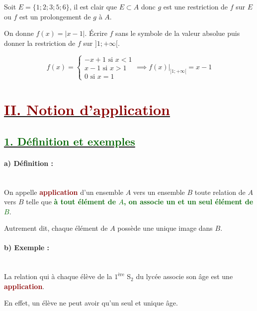 \documentclass[12pt,a4paper]{article}
\newcounter{exemple} %
\begin{document}
Soit $E = \{1 ; 2 ; 3 ; 5 ; 6\}$, il est clair que {\color{darkred}$E \subset A$} donc {\color{darkred}$g$ est une restriction} de $f$ sur $E$ ou {\color{darkred}$f$ est un prolongement} de $g$ à $A$.

On donne $f(x) = |x - 1|$. Écrire $f$ sans le symbole de la valeur absolue puis donner la restriction de $f$ sur $]1 ; +\infty[$.

$$
f(x) = \begin{cases} 
-x + 1 \text{ si } x < 1 \\ 
x - 1 \text{ si } x > 1 \\ 
0 \text{ si } x = 1 
\end{cases} 
\implies \boxed{\left. f(x) \right|_{]1 ; +\infty[} = x - 1}
$$

\section*{\underline{\textbf{\textcolor{darkred}{II. Notion d'application}}}}
\subsection*{\underline{\textbf{\textcolor{darkgreen}{1. Définition et exemples}}}}

\paragraph{\color{darkred}a) Définition :}~\\


On appelle \textcolor{darkred}{\textbf{application}} d'un ensemble $A$ vers un ensemble $B$
toute relation de $A$ vers $B$ telle que \textcolor{darkgreen}{\textbf{à tout élément de $A$,
on associe un et un seul élément de $B$}}.

Autrement dit, chaque élément de $A$ possède une unique image dans $B$.


\paragraph{\color{darkred}b) Exemple :}~\\

La relation qui à chaque élève de la $1^{\text{ère}}$ S$_2$ du lycée
associe son âge est une \textcolor{darkred}{\textbf{application}}.

En effet, un élève ne peut avoir qu'un seul et unique âge.
\end{document}
